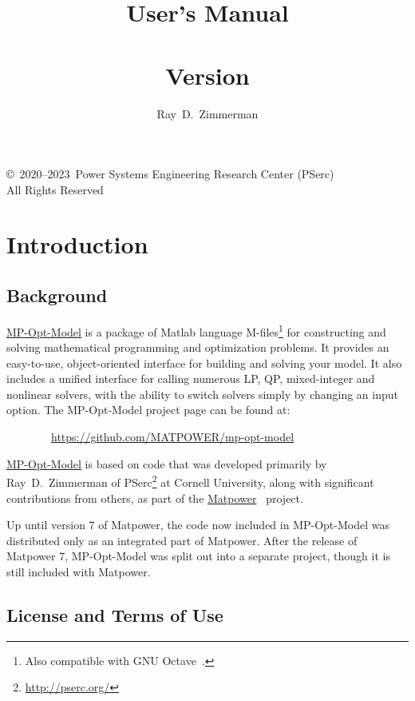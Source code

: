 \documentclass[12pt]{article}
\title{{\huge \bfseries \mpomname{} User's Manual } \\ ~ \\ \LARGE Version \mpomver{}}
\author{Ray~D.~Zimmerman}
\newcommand{\matlab}[0]{{\sc Matlab}}
\newcommand{\matpower}[0]{{\sc Matpower}}
\newcommand{\matpowerurl}[0]{https://matpower.org}
\newcommand{\matpowerlink}[0]{\href{\matpowerurl}{\matpower{}}}
\newcommand{\mpom}[0]{\mbox{MP-Opt-Model}}
\newcommand{\mpomurl}[0]{https://github.com/MATPOWER/mp-opt-model}
\newcommand{\mpomlink}[0]{\href{\mpomurl}{\mpom{}}}
\newcommand{\pserc}[0]{{\sc PSerc}}
\newcommand{\PSERC}[0]{{Power Systems Engineering Research Center (\pserc{})}}
\numberwithin{equation}{section}
\numberwithin{table}{section}
\numberwithin{figure}{section}
\begin{document}
\maketitle
\thispagestyle{empty}
\vfill
\begin{center}
{\scriptsize
\copyright~2020--2023~\PSERC{}\\
All Rights Reserved}
\end{center}

\clearpage
\tableofcontents
\clearpage
\listoftables

\clearpage
\section{Introduction}

\subsection{Background}

\mpomlink{} is a package of \matlab{} language M-files\footnote{Also compatible with GNU Octave~\cite{octave}.} for constructing and solving mathematical programming and optimization problems. It provides an easy-to-use, object-oriented interface for building and solving your model. It also includes a unified interface for calling numerous LP, QP, mixed-integer and nonlinear solvers, with the ability to switch solvers simply by changing an input option.
The \mpom{} project page can be found at:

\bigskip

~~~~~~~~\url{\mpomurl}

\bigskip

\mpomlink{} is based on code that was developed primarily by Ray~D.~Zimmerman of \pserc{}\footnote{\url{http://pserc.org/}} at Cornell University, along with significant contributions from others, as part of the \matpowerlink{}~\cite{zimmerman2011,matpower} project.

Up until version 7 of \matpower{}, the code now included in \mpom{} was distributed only as an integrated part of \matpower{}. After the release of \matpower{} 7, \mpom{} was split out into a separate project, though it is still included with \matpower{}.

\clearpage
\subsection{License and Terms of Use}
\end{document}
